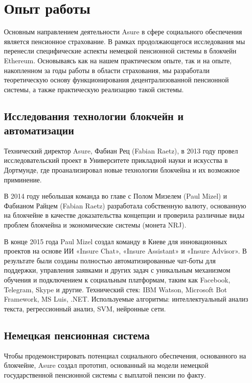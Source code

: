 \section{Опыт работы}

Основным направлением деятельности Asure в сфере социального обеспечения является пенсионное страхование. В рамках продолжающегося исследования мы перенесли специфические аспекты немецкой пенсионной системы в блокчейн Ethereum. Основываясь как на нашем практическом опыте, так и на опыте, накопленном за годы работы в области страхования, мы разработали теоретическую основу функционирования децентрализованной пенсионной системы, а также практическую реализацию такой системы. 

\subsection{Исследования технологии блокчейн и автоматизации}

Технический директор Asure, Фабиан Рец (Fabian Raetz), в 2013 году провел исследовательский проект в Университете прикладной науки и искусства в Дортмунде, где проанализировал новые технологии блокчейна и их возможное приминение. \cite{fraetz}
\newline

В 2014 году небольшая команда во главе с Полом Мизелем (Paul Mizel) и Фабианом Райцем (Fabian Raetz) разработала собственную валюту, основанную на блокчейне в качестве доказательства концепции и проверила различные виды проблем блокчейна и экономические системы (монета NRJ). \cite{nrjcoin}
\newline

В конце 2015 года Paul Mizel создал команду в Киеве для инновационных проектов на основе ИИ «Insure Chat», «Insure Assistant» и «Insure Advisor». В результате были созданы полностью автоматизированные чат-боты для поддержки, управления заявками и других задач с уникальным механизмом обучения и подключением к социальным платформам, таким как Facebook, Telegram, Skype и другие.\newline
Технический стек: IBM Watson, Microsoft Bot Framework, MS Luis, .NET.
\newline
Используемые алгоритмы: интеллектуальный анализ текста, регрессионный анализ, SVM, нейронные сети.

\subsection{Немецкая пенсионная система}
Чтобы продемонстрировать потенциал социального обеспечения, основанного на блокчейне, Asure создал прототип, основанный на модели немецкой государственной пенсионной системы с выплатой пенсии по факту.
\newline\newline

